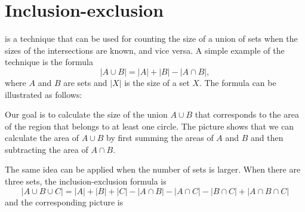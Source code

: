 \section{Inclusion-exclusion}


 is a technique
that can be used for counting the size
of a union of sets when the sizes of
the intersections are known, and vice versa.
A simple example of the technique is the formula
\[ |A \cup B| = |A| + |B| - |A \cap B|,\]
where $A$ and $B$ are sets and $|X|$
is the size of a set $X$.
The formula can be illustrated as follows:

\begin{center}
\end{center}

Our goal is to calculate
the size of the union $A \cup B$
that corresponds to the area of the region
that belongs to at least one circle.
The picture shows that we can calculate
the area of $A \cup B$ by first summing the
areas of $A$ and $B$ and then subtracting
the area of $A \cap B$.

The same idea can be applied when the number
of sets is larger.
When there are three sets, the inclusion-exclusion formula is
\[ |A \cup B \cup C| = |A| + |B| + |C| - |A \cap B|  - |A \cap C|  - |B \cap C| + |A \cap B \cap C| \]
and the corresponding picture is

\begin{center}
\end{center}

